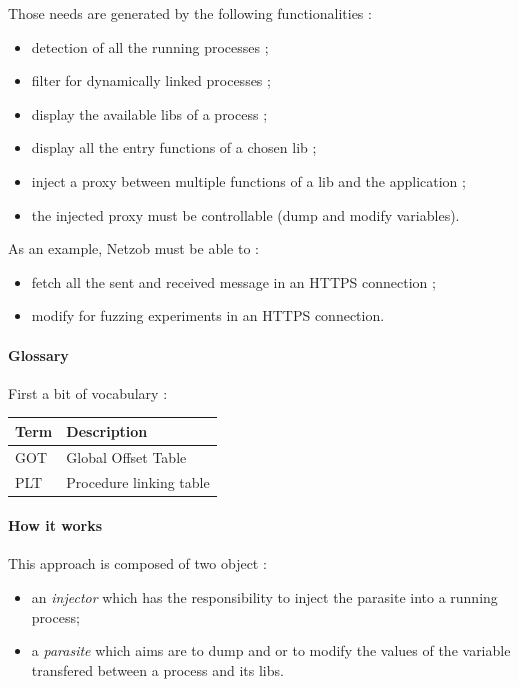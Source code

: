 \documentclass[letterpaper,10pt,english]{sphinxmanual}
\begin{document}
Those needs are generated by the following functionalities :
\begin{itemize}
\item {} 
detection of all the running processes ;

\item {} 
filter for dynamically linked processes ;

\item {} 
display the available libs of a process ;

\item {} 
display all the entry functions of a chosen lib ;

\item {} 
inject a proxy between multiple functions of a lib and the application ;

\item {} 
the injected proxy must be controllable (dump and modify variables).

\end{itemize}

As an example, Netzob must be able to :
\begin{itemize}
\item {} 
fetch all the sent and received message in an HTTPS connection ;

\item {} 
modify for fuzzing experiments in an HTTPS connection.

\end{itemize}


\paragraph{Glossary}
\label{Annexes/index:glossary}
First a bit of vocabulary :

\begin{tabulary}{\linewidth}{|L|L|}
\hline
\textbf{
Term
} & \textbf{
Description
}\\\hline

GOT
 & 
Global Offset Table
\\\hline

PLT
 & 
Procedure linking table
\\\hline
\end{tabulary}



\paragraph{How it works}
\label{Annexes/index:how-it-works}
This approach is composed of two object :
\begin{itemize}
\item {} 
an \emph{injector} which has the responsibility to inject the parasite into a running process;

\item {} 
a \emph{parasite} which aims are to dump and or to modify the values of the variable transfered between a process and its libs.

\end{itemize}
\end{document}
